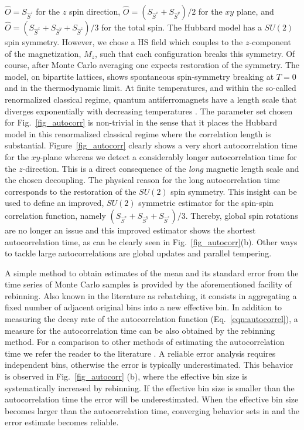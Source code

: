 $\hat{O} = S_{\hat{S}^{z}}$ for the $z$ spin direction, 
$\hat{O} =(S_{\hat{S}^{x}} + S_{\hat{S}^{y}})/2$ for the $xy$ plane, and
$\hat{O} =(S_{\hat{S}^{x}} + S_{\hat{S}^{y}}+ S_{\hat{S}^{z}})/3$ for the total spin.
The Hubbard model  has a $SU(2)$ spin symmetry. However, we chose a HS field which couples to the $z$-component of the magnetization,  $M_z$,  such that each configuration breaks this symmetry. Of course, after Monte Carlo averaging one expects restoration of the symmetry. The model, on bipartite  lattices,  shows spontaneous spin-symmetry breaking at $T=0$ and in the thermodynamic limit.  At finite temperatures, and within the so-called renormalized classical regime,  quantum antiferromagnets have a length scale  that  diverges  exponentially  with decreasing temperatures \cite{Chakravarty88}.     
The parameter set chosen for Fig.~\ref{fig_autocorr}  is non-trivial in the sense that it places the Hubbard model in this renormalized classical regime where the correlation length is substantial.  Figure~\ref{fig_autocorr}  clearly shows a very short autocorrelation time for the $xy$-plane whereas we detect a considerably longer  autocorrelation time  for the $z$-direction.  This is a direct consequence of the \emph{long} magnetic length scale and the chosen decoupling.
The physical reason for the long autocorrelation time  corresponds to  the restoration of the $SU(2)$ spin symmetry.    This insight can be used to define an improved, $SU(2)$ symmetric estimator for the spin-spin correlation function, namely
$(S_{\hat{S}^{x}} + S_{\hat{S}^{y}} + S_{\hat{S}^{z}})/3$. 
Thereby, global spin rotations are no longer an issue and this improved estimator  shows the shortest autocorrelation time, as can be clearly seen in Fig.~\ref{fig_autocorr}(b). Other ways to tackle large autocorrelations are global updates and parallel tempering.

A simple method to obtain estimates of the mean and its standard error from the time series of Monte Carlo samples is provided by the aforementioned facility of rebinning. Also known in the literature as rebatching, it consists in aggregating a fixed number  of adjacent original bins into a new effective bin.
In addition to measuring the decay rate of the autocorrelation function (Eq.~\eqref{eqn:autocorrel}), a measure for the autocorrelation time  can be also obtained by the rebinning method. 
For a comparison to other methods of estimating the autocorrelation time we refer the reader to the literature \cite{Thompson2010, Geyer1992, neal1993}.
A reliable error analysis requires independent bins, otherwise the error is typically underestimated. This behavior is observed in Fig.~\ref{fig_autocorr} (b), where the effective bin size is systematically increased by rebinning. If the effective bin size is smaller than the autocorrelation time the error will be underestimated. When the effective bin size becomes  larger than the autocorrelation time, converging behavior sets in and the error estimate becomes reliable.

